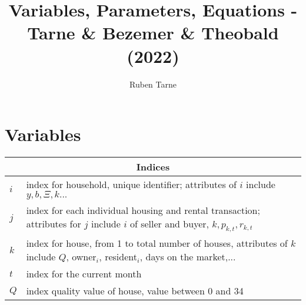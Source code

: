 \documentclass[]{article}
\title{Variables, Parameters, Equations - Tarne \& Bezemer \& Theobald (2022)}
\author{Ruben Tarne}
\begin{document}
\maketitle 

\section{Variables}


\begin{tabular}{p{0.5cm} p{11cm}}
	
	\multicolumn{2}{c}{Indices}\\
	\hline
	
	
	$i$ & index for household, unique identifier; attributes of $i$ include ${y, b, \Xi, k...}$  \\ 
		
	$j$ & index for each individual housing and rental transaction; attributes for $j$ include $i$ of seller and buyer, ${k, p_{k,t}, r_{k,t} }$  \\ 	
	
	$k$ & index for house, from 1 to total number of houses,  attributes of $k$ include $Q$, owner$_{i}$, resident$_{i}$, days on the market,... \\
		
	$t$ & index for the current month \\ 
	
	$Q$ & index quality value of house, value between 0 and 34 \\
	

	
	
\end{tabular}
\end{document}
